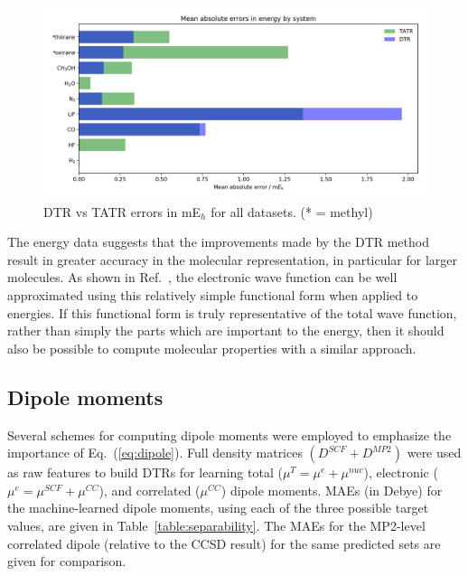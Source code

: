 \begin{figure}
    \centering
    \includegraphics[angle=90, scale=.9]{p2/figures/E_err.png}
    \caption{DTR vs TATR errors in mE$_h$ for all datasets. (* = methyl)}
    \label{fig:E_sum}
\end{figure}

The energy data suggests that the improvements made by the DTR method result in greater accuracy in the molecular representation, in particular for larger molecules.
As shown in Ref.~, the electronic wave function can be well approximated using this relatively simple functional form when applied to energies. 
If this functional form is truly representative of the total wave function, rather than simply the parts which are important to the energy, then it should also be possible to compute molecular properties with a similar approach. 

\subsection{Dipole moments} \label{dip}

Several schemes for computing dipole moments were employed to emphasize the importance of Eq.~(\ref{eq:dipole}). 
Full density matrices $(D^{SCF} + D^{MP2})$ were used as raw features to build DTRs for learning total ($\mu^{T} = \mu^{e} + \mu^{nuc}$), electronic ($\mu^{e} = \mu^{SCF} + \mu^{CC}$), and correlated ($\mu^{CC}$) dipole moments.
MAEs (in Debye) for the machine-learned dipole moments, using each of the three possible target values, are given in Table~\ref{table:separability}.  
The MAEs for the MP2-level correlated dipole (relative to the CCSD result) for the same predicted sets are given for comparison.

